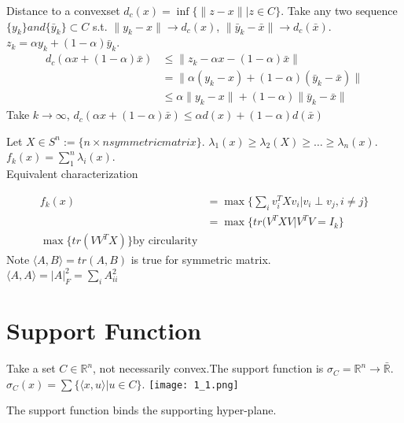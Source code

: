 \documentclass[11pt,fleqn]{book} %
\def\R{\mathbb{R}}
\newcommand{\cvx}{convex}
\begin{document}
\begin{example}[Distance]
Distance to a \cvx  set $d_c(x) = \inf \{ \| z-x \| | z \in C \}$. Take any two sequence $\{ y_k\} and \{ \bar{y}_k\} \subset C$ s.t. $\| y_k - x\| \to d_c(x)$, $\| \bar{y}_k - \bar{x}\| \to d_c(\bar{x})$. $z_k = \alpha y_k + (1 - \alpha) \bar{y}_k$.
\begin{align*}
d_c(\alpha x + (1-\alpha) \bar{x}) &\le \| z_k - \alpha x - (1 - \alpha) \bar{x}\| \\
& = \| \alpha(y_k - x) + (1 - \alpha)(\bar{y}_k - \bar{x})\| \\
& \le \alpha \| y_k - x\| + (1 - \alpha ) \|\bar{y}_k - \bar{x}\|
\end{align*}
Take $k \to \infty$, $d_c(\alpha x + (1 - \alpha) \bar{x}) \le \alpha d(x) + (1 - \alpha) d(\bar{x})$
\end{example}
\begin{example}[Eigenvalues]
Let $X \in S^n := \{ n \times n symmetric matrix\}$. $\lambda_1(x) \ge \lambda_2(X) \ge \ldots \ge \lambda_n(x)$.\\
$f_k(x) = \sum_{1}^n \lambda_i(x)$.\\
Equivalent characterization 

\begin{align*}
f_k(x) & = \max\{ \sum_{i} v_i^T Xv_i | v_i \perp v_j , i \neq j\} \\
& =  \max\{ tr( V^TXV | V^T V = I_k \} \\
\max \{tr(VV^TX) \} \text{by circularity}
\end{align*}
Note $\langle A,B\rangle  = tr(A,B)$ is true for symmetric matrix. \\
$\langle A,A\rangle  = |A |_F^2 = \sum_{i} A_{ii}^2$
\end{example}

\section{Support Function}
Take a set $C \in \R^n$, not necessarily convex.The support function is $\sigma_C = \R^n \to \bar{\R}$. $\sigma_C(x) = \sum \{ \langle x,u\rangle  | u \in C\}$.
\texttt{[image: 1\_1.png]}
\begin{fact}
The support function binds the supporting hyper-plane.
\end{fact}
\end{document}
